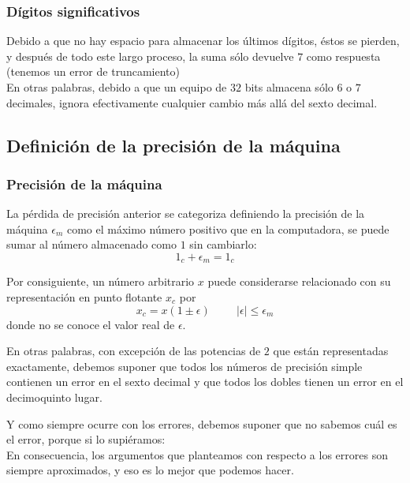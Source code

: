\begin{frame}
\frametitle{Dígitos significativos}
Debido a que no hay espacio para almacenar los últimos dígitos, éstos se pierden, y después de todo este largo proceso, la suma sólo devuelve $7$ como respuesta (tenemos un error de truncamiento)
\\
\bigskip
\pause
En otras palabras, debido a que un equipo de $32$ bits almacena sólo $6$ o $7$ decimales, ignora efectivamente cualquier cambio más allá del sexto decimal.    
\end{frame}
\subsection{Definición de la precisión de la máquina}
\begin{frame}
\frametitle{Precisión de la máquina}
La pérdida de precisión anterior se categoriza definiendo la precisión de la máquina $\epsilon_{m}$ como el máximo número positivo que en la computadora, se puede sumar al número almacenado como $1$ sin cambiarlo:    
\begin{equation}
1_{c} + \epsilon_{m} = 1_{c}
\label{eq:ecuacion_01_14}
\end{equation}
\end{frame}
\begin{frame}
Por consiguiente, un número arbitrario $x$ puede considerarse relacionado con su representación en punto flotante $x_{c}$ por
\[ x_{c} = x(1 \pm \epsilon) \hspace{1cm} \vert \epsilon \vert \leq \epsilon_{m} \]
donde no se conoce el valor real de $\epsilon$.
\end{frame}
\begin{frame}
En otras palabras, con excepción de las potencias de $2$ que están representadas exactamente, debemos suponer que todos los números de precisión simple contienen un error en el sexto decimal y que todos los dobles tienen un error en el decimoquinto lugar.
 \end{frame}
 \begin{frame}
Y como siempre ocurre con los errores, debemos suponer que no sabemos cuál es el error, porque si lo supiéramos: 
\\
\bigskip
En consecuencia, los argumentos que planteamos con respecto a los errores son siempre aproximados, y eso es lo mejor que podemos hacer.
\end{frame}
